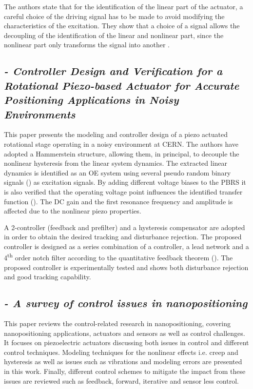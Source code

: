 The authors state that for the identification of the linear part of the actuator, a careful choice of the driving signal has to be made to avoid modifying the characteristics of the excitation. They show that a choice of a \abbrPBRS signal allows the decoupling of the identification of the linear and nonlinear part, since the nonlinear part only transforms the \abbrPBRS signal into another \abbrPBRS.

\subsection*{\citep*{ButcherController:2015} {\small \emph{- Controller Design and Verification for a Rotational Piezo-based Actuator for Accurate Positioning Applications in Noisy Environments}} }
This paper presents the modeling and controller design of a piezo actuated rotational stage operating in a noisy environment at CERN. The authors have adopted a Hammerstein structure, allowing them, in principal, to decouple the nonlinear hysteresis from the linear system dynamics. The extracted linear dynamics is identified as an OE system using several pseudo random binary signals (\abbrPBRS) as excitation signals. By adding different voltage biases to the PBRS it is also verified that the operating voltage point influences the identified transfer function (\abbrTF). The DC gain and the first resonance frequency and amplitude is affected due to the nonlinear piezo properties.

A 2-\abbrDOF controller (feedback and prefilter) and a hysteresis compensator are adopted in order to obtain the desired tracking and disturbance rejection. The proposed controller is designed as a series combination of a \abbrPID controller, a lead network and a 4\textsuperscript{th} order notch filter according to the quantitative feedback theorem (\abbrQFT). The proposed controller is experimentally tested and shows both disturbance rejection and good tracking capability.

\subsection*{\citep*{SurveyOfControlIssues:2007} {\small \emph{- A survey of control issues in nanopositioning}} }
This paper reviews the control-related research in nanopositioning, covering nanopositioning applications, actuators and sensors as well as control challenges. It focuses on piezoelectric actuators discussing both issues in control and different control techniques. Modeling techniques for the nonlinear effects i.e. creep and hysteresis as well as issues such as vibrations and modeling errors are presented in this work. Finally, different control schemes to mitigate the impact from these issues are reviewed such as feedback, forward, iterative and sensor less control.


